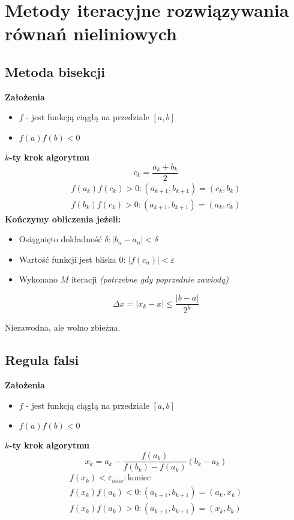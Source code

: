 \documentclass[../mn-notatki.tex]{subfiles}
\begin{document}
\section{Metody iteracyjne rozwiązywania równań nieliniowych}

\subsection{Metoda bisekcji}

\begin{tcolorbox}
\textbf{Założenia}
\begin{itemize}
    \item $f$ - jest funkcją ciągłą na przedziale $[a,b]$
    \item $f(a)f(b) < 0$\\
\end{itemize}

\textbf{$k$-ty krok algorytmu}
\[
c_k = \frac{a_k + b_k}{2}
\]
\begin{gather*}
f(a_k)f(c_k) > 0 : (a_{k+1}, b_{k+1}) = (c_k, b_k)\\
f(b_k)f(c_k) > 0 : (a_{k+1}, b_{k+1}) = (a_k, c_k)
\end{gather*}
\textbf{Kończymy obliczenia jeżeli:}
\begin{itemize}
    \item Osiągnięto dokładność $\delta: |b_n - a_n| < \delta$
    \item Wartość funkcji jest bliska $0$: $|f(c_n)| < \varepsilon$
    \item Wykonano $M$ iteracji \textit{(potrzebne gdy poprzednie zawiodą)}\\
\end{itemize}
\[
\Delta x = |x_k - x| \leqslant \frac{|b - a|}{2^k}
\]

Niezawodna, ale wolno zbieżna.
\end{tcolorbox}

\subsection{Regula falsi}

\begin{tcolorbox}
\textbf{Założenia}
\begin{itemize}
    \item $f$ - jest funkcją ciągłą na przedziale $[a,b]$
    \item $f(a)f(b) < 0$\\
\end{itemize}

\textbf{$k$-ty krok algorytmu}
\[
x_k = a_k - \frac{f(a_k)}{f(b_k) - f(a_k)}(b_k - a_k)
\]
\begin{gather*}
f(x_k) < \varepsilon_{max} : \text{koniec}\\
f(x_k)f(a_k) < 0 : (a_{k+1}, b_{k+1}) = (a_k, x_k)\\
f(x_k)f(a_k) > 0 : (a_{k+1}, b_{k+1}) = (x_k, b_k)
\end{gather*}

\end{tcolorbox}
\end{document}
